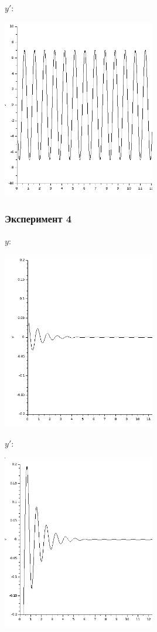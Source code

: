 \documentclass[12pt, a4paper] {ncc}
\begin{document}
$y'$:
\begin{center}
\includegraphics[width=0.5\textwidth]{3y1}
\end{center}

\subsubsection{Эксперимент 4}

$y$:
\begin{center}
\includegraphics[width=0.5\textwidth]{4y}
\end{center}

$y'$:
\begin{center}
\includegraphics[width=0.5\textwidth]{4y1}
\end{center}
\end{document}
